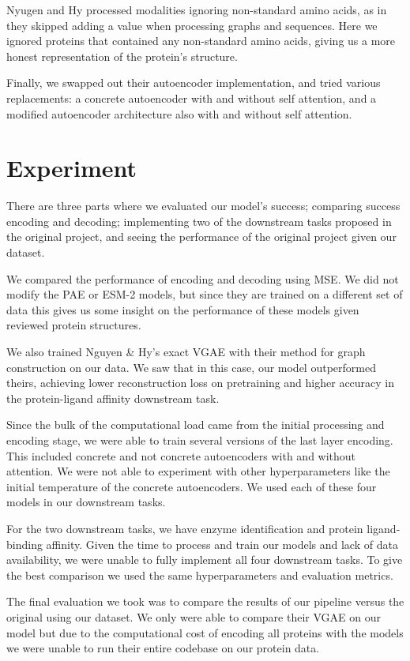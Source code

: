 \documentclass{article}
\begin{document}
Nyugen and Hy processed modalities ignoring non-standard amino acids, as in they skipped adding a value when processing graphs and sequences. Here we ignored proteins that contained any non-standard amino acids, giving us a more honest representation of the protein’s structure. 

Finally, we swapped out their autoencoder implementation, and tried various replacements: a concrete autoencoder with and without self attention, and a modified autoencoder architecture also with and without self attention. 

\section{Experiment}
There are three parts where we evaluated our model's success; comparing success encoding and decoding; implementing two of the downstream tasks proposed in the original project, and seeing the performance of the original project given our dataset. 

We compared the performance of encoding and decoding using MSE. We did not modify the PAE or ESM-2 models, but since they are trained on a different set of data this gives us some insight on the performance of these models given reviewed protein structures. 

We also trained Nguyen \& Hy’s exact VGAE with their method for graph construction on our data. We saw that in this case, our model outperformed theirs, achieving lower reconstruction loss on pretraining and higher accuracy in the protein-ligand affinity downstream task.

Since the bulk of the computational load came from the initial processing and encoding stage, we were able to train several versions of the last layer encoding. This included concrete and not concrete autoencoders with and without attention. We were not able to experiment with other hyperparameters like the initial temperature of the concrete autoencoders. We used each of these four models in our downstream tasks.

For the two downstream tasks, we have enzyme identification and protein ligand-binding affinity. Given the time to process and train our models and lack of data availability, we were unable to fully implement all four downstream tasks. To give the best comparison we used the same hyperparameters and evaluation metrics.

The final evaluation we took was to compare the results of our pipeline versus the original using our dataset. We only were able to compare their VGAE on our model but due to the computational cost of encoding all proteins with the models we were unable to run their entire codebase on our protein data.
\end{document}
